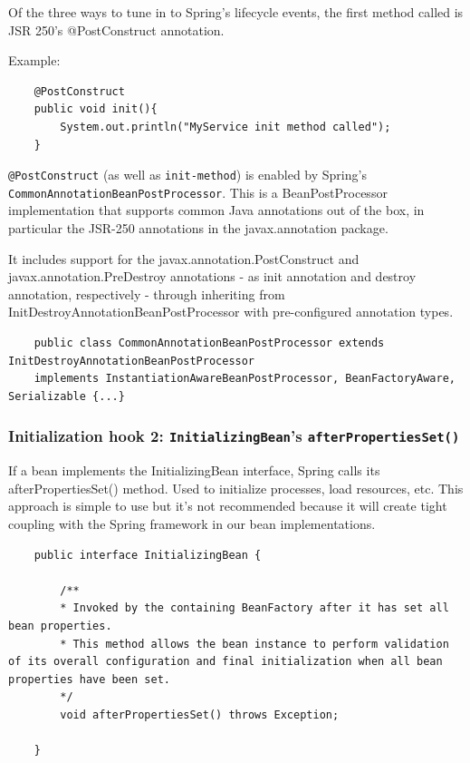 \documentclass{scrartcl}
\begin{document}
Of the three ways to tune in to Spring's lifecycle events, the first method called is JSR 250's @PostConstruct annotation.

Example:

\begin{lstlisting}
    @PostConstruct
    public void init(){
        System.out.println("MyService init method called");
    }
\end{lstlisting}

\lstinline|@PostConstruct| (as well as \lstinline|init-method|) is enabled by Spring's  \lstinline|CommonAnnotationBeanPostProcessor|. This is a
BeanPostProcessor implementation that supports common Java annotations out of the box, in particular the JSR-250 annotations in the javax.annotation package.

It includes support for the javax.annotation.PostConstruct and javax.annotation.PreDestroy annotations - as init annotation and destroy annotation, respectively - through inheriting from InitDestroyAnnotationBeanPostProcessor with pre-configured annotation types.

\begin{lstlisting}
    public class CommonAnnotationBeanPostProcessor extends InitDestroyAnnotationBeanPostProcessor
    implements InstantiationAwareBeanPostProcessor, BeanFactoryAware, Serializable {...}

\end{lstlisting}

\subsubsection{Initialization hook 2: \lstinline|InitializingBean|’s \lstinline|afterPropertiesSet()|}
If a bean implements the InitializingBean interface, Spring calls its afterPropertiesSet() method. Used to initialize processes,  load resources, etc. This approach is simple to use but it’s not recommended because it will create tight coupling with the Spring framework in our bean implementations.

\begin{lstlisting}
    public interface InitializingBean {

        /**
        * Invoked by the containing BeanFactory after it has set all bean properties.
        * This method allows the bean instance to perform validation of its overall configuration and final initialization when all bean properties have been set.
        */
        void afterPropertiesSet() throws Exception;

    }
\end{lstlisting}
\end{document}

